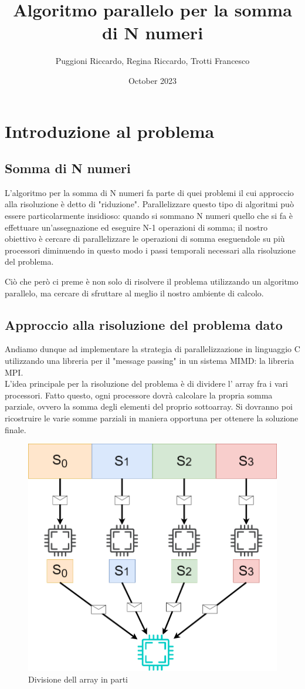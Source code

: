 \documentclass{article}
\title{Algoritmo parallelo per la somma di N numeri}
\author{Puggioni Riccardo, Regina Riccardo, Trotti Francesco }
\date{October 2023}
\begin{document}
\maketitle

\newpage
\tableofcontents

\newpage
\section{Introduzione al problema}
\subsection{Somma di N numeri}
    L'algoritmo per la somma di N numeri fa parte di quei problemi
    il cui approccio alla risoluzione è detto di "riduzione".
    Parallelizzare questo tipo di algoritmi può essere particolarmente insidioso:
    quando si sommano N numeri quello che si fa è effettuare un'assegnazione ed eseguire N-1
    operazioni di somma; il nostro obiettivo è cercare di parallelizzare le operazioni di somma eseguendole su più processori diminuendo in questo modo i passi temporali necessari alla risoluzione del problema.

    Ciò che però ci preme è non solo di risolvere il problema utilizzando un algoritmo parallelo, ma cercare di sfruttare al meglio il nostro ambiente di calcolo.
\subsection{Approccio alla risoluzione del problema dato}

    Andiamo dunque ad implementare la strategia di parallelizzazione in linguaggio C utilizzando una libreria per il "message passing" in un sistema MIMD: la libreria MPI.
    \\
    L'idea principale per la risoluzione del problema è di dividere l' array fra i vari processori.
    Fatto questo, ogni processore dovrà calcolare la propria somma parziale, ovvero la somma degli elementi del proprio sottoarray.
    Si dovranno poi ricostruire le varie somme parziali in maniera opportuna per ottenere la soluzione finale.\\
    \begin{figure}[!htbp]
        \includegraphics[width=0.3\linewidth,center]{divisione_array.drawio.png}
        \caption{Divisione dell array in parti}
        \label{fig:enter-label}
    \end{figure}  
    
\end{document}
